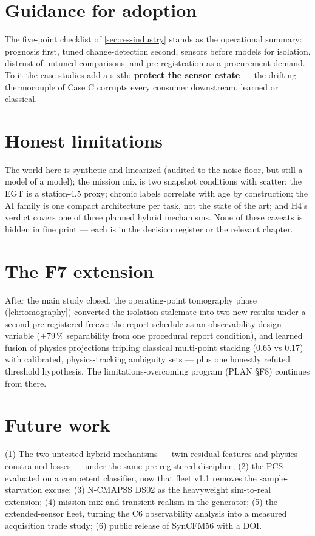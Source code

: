 \section{Guidance for adoption}

The five-point checklist of \cref{sec:res-industry} stands as the operational summary:
prognosis first, tuned change-detection second, sensors before models for isolation,
distrust of untuned comparisons, and pre-registration as a procurement demand. To it the
case studies add a sixth: \textbf{protect the sensor estate} --- the drifting thermocouple
of Case C corrupts every consumer downstream, learned or classical.

\section{Honest limitations}

The world here is synthetic and linearized (audited to the noise floor, but still a model
of a model); the mission mix is two snapshot conditions with scatter; the EGT is a
station-4.5 proxy; chronic labels correlate with age by construction; the AI family is one
compact architecture per task, not the state of the art; and H4's verdict covers one of
three planned hybrid mechanisms. None of these caveats is hidden in fine print --- each is
in the decision register or the relevant chapter.

\section{The F7 extension}

After the main study closed, the operating-point tomography phase (\cref{ch:tomography})
converted the isolation stalemate into two new results under a second pre-registered
freeze: the report schedule as an observability design variable ($+79\,\%$ separability
from one procedural report condition), and learned fusion of physics projections tripling
classical multi-point stacking (0.65 vs 0.17) with calibrated, physics-tracking ambiguity
sets --- plus one honestly refuted threshold hypothesis. The limitations-overcoming program
(PLAN \S F8) continues from there.

\section{Future work}

(1) The two untested hybrid mechanisms --- twin-residual features and physics-constrained
losses --- under the same pre-registered discipline; (2) the PCS evaluated on a competent
classifier, now that fleet v1.1 removes the sample-starvation excuse; (3) N-CMAPSS DS02 as
the heavyweight sim-to-real extension; (4) mission-mix and transient realism in the
generator; (5) the extended-sensor fleet, turning the C6 observability analysis into a
measured acquisition trade study; (6) public release of SynCFM56 with a DOI.
